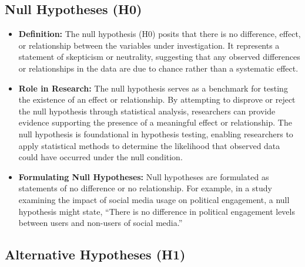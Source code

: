 \documentclass[
]{book}
\begin{document}
\hypertarget{null-hypotheses-h0}{%
\subsection*{Null Hypotheses (H0)}\label{null-hypotheses-h0}}

\begin{itemize}
\item
  \textbf{Definition:} The null hypothesis (H0) posits that there is no difference, effect, or relationship between the variables under investigation. It represents a statement of skepticism or neutrality, suggesting that any observed differences or relationships in the data are due to chance rather than a systematic effect.
\item
  \textbf{Role in Research:} The null hypothesis serves as a benchmark for testing the existence of an effect or relationship. By attempting to disprove or reject the null hypothesis through statistical analysis, researchers can provide evidence supporting the presence of a meaningful effect or relationship. The null hypothesis is foundational in hypothesis testing, enabling researchers to apply statistical methods to determine the likelihood that observed data could have occurred under the null condition.
\item
  \textbf{Formulating Null Hypotheses:} Null hypotheses are formulated as statements of no difference or no relationship. For example, in a study examining the impact of social media usage on political engagement, a null hypothesis might state, ``There is no difference in political engagement levels between users and non-users of social media.''
\end{itemize}

\hypertarget{alternative-hypotheses-h1}{%
\subsection*{Alternative Hypotheses (H1)}\label{alternative-hypotheses-h1}}
\end{document}
